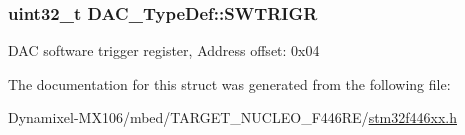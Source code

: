 \subsubsection[{\texorpdfstring{S\+W\+T\+R\+I\+GR}{SWTRIGR}}]{ uint32\+\_\+t D\+A\+C\+\_\+\+Type\+Def\+::\+S\+W\+T\+R\+I\+GR}\hypertarget{struct_d_a_c___type_def_a4ccb66068a1ebee1179574dda20206b6}{}\label{struct_d_a_c___type_def_a4ccb66068a1ebee1179574dda20206b6}
D\+AC software trigger register, Address offset\+: 0x04 

The documentation for this struct was generated from the following file\+:\begin{DoxyCompactItemize}
\item 
Dynamixel-\/\+M\+X106/mbed/\+T\+A\+R\+G\+E\+T\+\_\+\+N\+U\+C\+L\+E\+O\+\_\+\+F446\+R\+E/\hyperlink{stm32f446xx_8h}{stm32f446xx.\+h}\end{DoxyCompactItemize}
